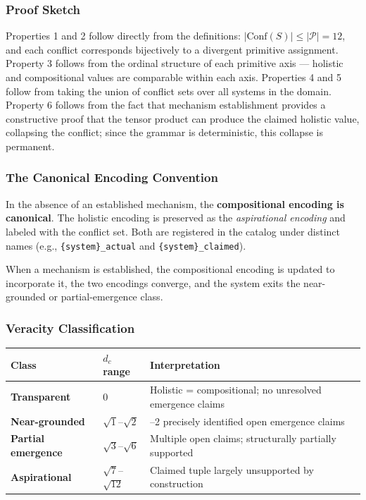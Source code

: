 \documentclass[12pt,a4paper]{article}
\begin{document}
\subsubsection{Proof Sketch}

Properties 1 and 2 follow directly from the definitions: $|\text{Conf}(S)| \leq |\mathcal{P}| = 12$, and each conflict corresponds bijectively to a divergent primitive assignment. Property 3 follows from the ordinal structure of each primitive axis --- holistic and compositional values are comparable within each axis. Properties 4 and 5 follow from taking the union of conflict sets over all systems in the domain. Property 6 follows from the fact that mechanism establishment provides a constructive proof that the tensor product can produce the claimed holistic value, collapsing the conflict; since the grammar is deterministic, this collapse is permanent.

\subsubsection{The Canonical Encoding Convention}

In the absence of an established mechanism, the \textbf{compositional encoding is canonical}. The holistic encoding is preserved as the \emph{aspirational encoding} and labeled with the conflict set. Both are registered in the catalog under distinct names (e.g., \texttt{\{system\}\_actual} and \texttt{\{system\}\_claimed}).

When a mechanism is established, the compositional encoding is updated to incorporate it, the two encodings converge, and the system exits the near-grounded or partial-emergence class.

\subsubsection{Veracity Classification}

\begin{table}[htbp]
\centering
\small
{}
\begin{tabularx}{\textwidth}{>{\centering\arraybackslash}X >{\centering\arraybackslash}X >{\centering\arraybackslash}X}
\toprule
\rowcolor{gray!25}\textbf{Class} & \textbf{$d_c$ range} & \textbf{Interpretation} \\
\midrule
\rowcolors{1}{white}{gray!10}
\textbf{Transparent} & $0$ & Holistic = compositional; no unresolved emergence claims \\
\textbf{Near-grounded} & $\sqrt{1}$--$\sqrt{2}$ & 1--2 precisely identified open emergence claims \\
\textbf{Partial emergence} & $\sqrt{3}$--$\sqrt{6}$ & Multiple open claims; structurally partially supported \\
\textbf{Aspirational} & $\sqrt{7}$--$\sqrt{12}$ & Claimed tuple largely unsupported by construction \\
\bottomrule
\end{tabularx}
\end{table}
\end{document}
